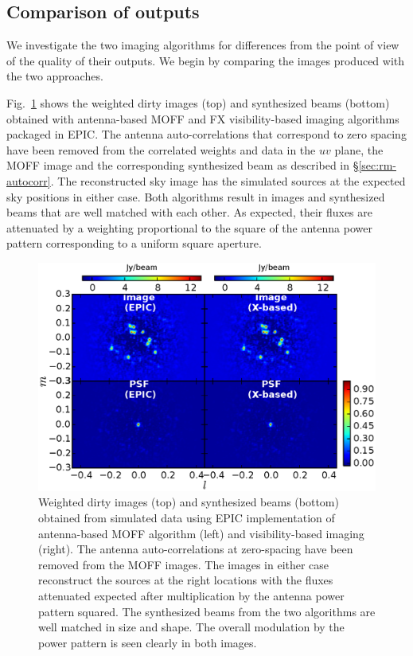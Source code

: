 \documentclass[a4paper,fleqn,usenatbib]{mnras}
\begin{document}
\subsection{Comparison of outputs}\label{sec:diff}

We investigate the two imaging algorithms for differences from the point of 
view of the quality of their outputs. We begin by comparing the images produced 
with the two approaches. 

Fig.~\ref{fig:MOFF-FX-image} shows the weighted dirty images (top) and synthesized beams (bottom) obtained with antenna-based MOFF and FX visibility-based imaging algorithms packaged in EPIC. The antenna auto-correlations that correspond to zero spacing have been removed from the correlated weights and data in the $uv$ plane, the MOFF image and the corresponding synthesized beam as described in \S\ref{sec:rm-autocorr}. The reconstructed sky image has the simulated sources at the expected sky positions in either case. Both algorithms result in images and synthesized beams that are well matched with each other. As expected, their fluxes are attenuated by a weighting proportional to the square of the antenna power pattern corresponding to a uniform square aperture.

\begin{figure}
  \includegraphics[width=\columnwidth]{figure5}
  \caption{Weighted dirty images (top) and synthesized beams (bottom) obtained from simulated data using EPIC implementation of antenna-based MOFF algorithm (left) and visibility-based imaging (right). The antenna auto-correlations at zero-spacing have been removed from the MOFF images. The images in either case reconstruct the sources at the right locations with the fluxes attenuated expected after multiplication by the antenna power pattern squared. The synthesized beams from the two algorithms are well matched in size and shape. The overall modulation by the power pattern is seen clearly in both images.}
  \label{fig:MOFF-FX-image}
\end{figure}
\end{document}
